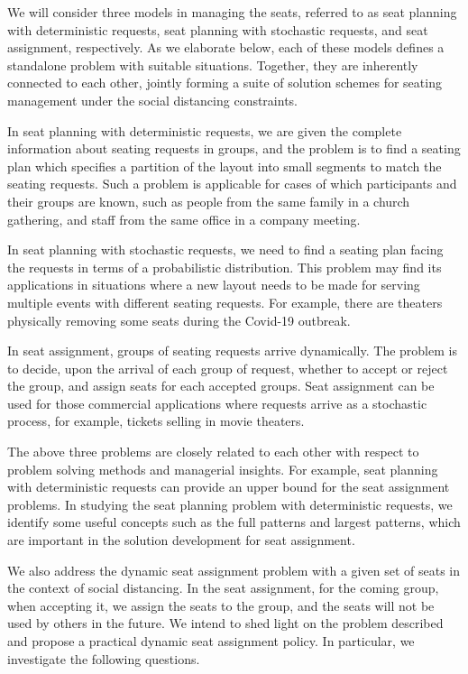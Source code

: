 We will consider three models in managing the seats, referred to as seat planning with deterministic requests, seat planning with stochastic requests, and seat assignment, respectively. As we elaborate below, each of these models defines a standalone problem with suitable situations. Together, they are inherently connected to each other, jointly forming a suite of solution schemes for seating management under the social distancing constraints.

In seat planning with deterministic requests, we are given the complete information about seating requests in groups, and the problem is to find a seating plan which specifies a partition of the layout into small segments to match the seating requests. Such a problem is applicable for cases of which participants and their groups are known, such as people from the same family in a church gathering, and staff from the same office in a company meeting.
 
In seat planning with stochastic requests, we need to find a seating plan facing the requests in terms of a probabilistic distribution. This problem may find its applications in situations where a new layout needs to be made for serving multiple events with different seating requests. For example, there are theaters physically removing some seats during the Covid-19 outbreak. \cite{Berlin_theater}

In seat assignment, groups of seating requests arrive dynamically. The problem is to decide, upon the arrival of each group of request, whether to accept or reject the group, and assign seats for each accepted groups. Seat assignment can be used for those  commercial applications where requests arrive as a stochastic process, for example, tickets selling in movie theaters.

The above three problems are closely related to each other with respect to problem solving methods and managerial insights. For example, seat planning with deterministic requests can provide an upper bound for the seat assignment problems. In studying the seat planning problem with deterministic requests, we identify some useful concepts such as the full patterns and largest patterns, which are important in the solution development for seat assignment.


We also address the dynamic seat assignment problem with a given set of seats in the context of social distancing. In the seat assignment, for the coming group, when accepting it, we assign the seats to the group, and the seats will not be used by others in the future. We intend to shed light on the problem described and propose a practical dynamic seat assignment policy. In particular, we investigate the following questions.

